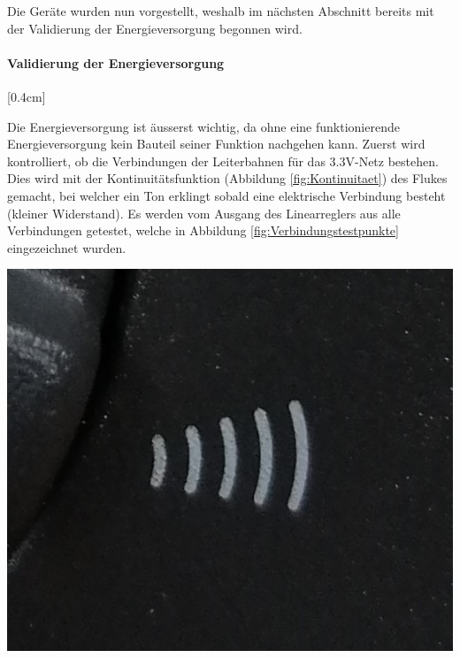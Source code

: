 Die Geräte wurden nun vorgestellt, weshalb im nächsten Abschnitt bereits mit der Validierung der Energieversorgung begonnen wird.
\newpage
\paragraph{\textbf{Validierung der Energieversorgung}}[0.4cm]
{\begin{minipage}[b][6.5cm][t]{0.42\textwidth}
Die Energieversorgung ist äusserst wichtig, da ohne eine funktionierende Energieversorgung kein Bauteil seiner Funktion nachgehen kann. Zuerst wird kontrolliert, ob die Verbindungen der Leiterbahnen für das 3.3V-Netz bestehen. Dies wird mit der Kontinuitätsfunktion (Abbildung \ref{fig:Kontinuitaet}) des Flukes gemacht, bei welcher ein Ton erklingt sobald eine elektrische Verbindung besteht (kleiner Widerstand). Es werden vom Ausgang des Linearreglers aus alle Verbindungen getestet, welche in Abbildung \ref{fig:Verbindungstestpunkte} eingezeichnet wurden.
\end{minipage}}
{\begin{minipage}[b][6.5cm][t]{0.57\textwidth}
\centering
\includegraphics[width=0.6\linewidth]{graphics/HW_Val/Kontinuitaet.jpg}
\label{fig:Kontinuitaet}
\end{minipage}}
